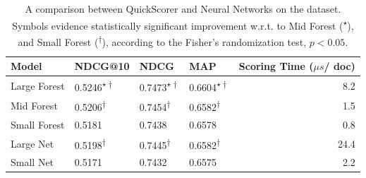 \begin{table}[htb]
\centering
\begin{tabular}{llllr}	
		\toprule
		Model & NDCG@10   & NDCG&  MAP & \thead{ Scoring Time \\ ($\mu s$/ doc)} \\
		\midrule
		Large Forest & 0.5246\textsuperscript{$\star \dag$} & 0.7473\textsuperscript{$\star \dag$} & 0.6604\textsuperscript{$\star \dag$} & 8.2  	\\
		\cdashlinelr{1-5}
		Mid Forest & 0.5206\textsuperscript{$\dag$}&0.7454\textsuperscript{$\dag$} &  0.6582\textsuperscript{$\dag$}& 1.5 	\\
		Small Forest & 0.5181& 0.7438 &  0.6578& 0.8 \\
		\midrule
		Large Net & 0.5198\textsuperscript{$\dag$} & 0.7445\textsuperscript{$\dag$} & 0.6582\textsuperscript{$\dag$} & 24.4 \\
		Small Net & 0.5171 &0.7432 & 0.6575   & 2.2 \\
		\bottomrule
\end{tabular}
\caption{A comparison between QuickScorer and Neural Networks on the \msn dataset. 
Symbols evidence statistically significant improvement w.r.t. to Mid Forest (\textsuperscript{$\star$}), and Small Forest (\textsuperscript{$\dag$}),  according to the Fisher's randomization test,  $p < 0.05$.}
\label{tab:firsttab}
\end{table}


